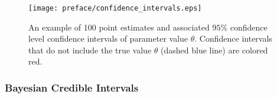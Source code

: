 \begin{figure}[htbp]
 \centering
 \texttt{[image: preface/confidence\_intervals.eps]}
 \caption{An example of 100 point estimates and associated $95\%$ confidence level confidence intervals of parameter value $\theta$.
  Confidence intervals that do not include the true value $\theta$ (dashed blue line) are colored red.}
 \label{fig:confidence_intervals}
\end{figure}

\subsubsection{Bayesian Credible Intervals}
